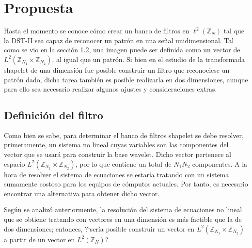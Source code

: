 \chapter{Propuesta}\label{chapter:proposal}

\par Hasta el momento se conoce c\'omo crear un banco de filtros en $\ell^2(\mathbb{Z}_N)$ tal que la DST-II sea capaz de reconocer un patr\'on en una se\~nal unidimensional. Tal como se vio en la secci\'on 1.2, una imagen puede ser definida como un vector de $L^2(\mathbb{Z}_{N_1}\times\mathbb{Z}_{N_2})$, al igual que un patr\'on. Si bien en el estudio de la transformada shapelet de una dimensi\'on fue posible construir un filtro que reconociese un patr\'on dado, dicha tarea tambi\'en es posible realizarla en dos dimensiones, aunque para ello sea necesario realizar algunos ajustes y consideraciones extras.\\

\section{Definici\'on del filtro}

\par Como bien se sabe, para determinar el banco de filtros shapelet se debe resolver, primeramente, un sistema no lineal cuyas variables son las componentes del vector que se usar\'a para construir la base wavelet. Dicho vector pertenece al espacio $L^2(\mathbb{Z}_{N_1}\times\mathbb{Z}_{N_2})$, por lo que contiene un total de $N_1N_2$ componentes. A la hora de resolver el sistema de ecuaciones se estar\'ia tratando con un sistema sumamente costoso para los equipos de c\'omputos actuales. Por tanto, es necesario encontrar una alternativa para obtener dicho vector.\\

\par Seg\'un se analiz\'o anteriormente, la resoluci\'on del sistema de ecuaciones no lineal que se obtiene tratando con vectores en una dimensi\'on es m\'as factible que la de dos dimensiones; entonces, ?`ser\'ia posible construir un vector en $L^2(\mathbb{Z}_{N_1}\times\mathbb{Z}_{N_2})$ a partir de un vector en $L^2(\mathbb{Z}_N)$?

